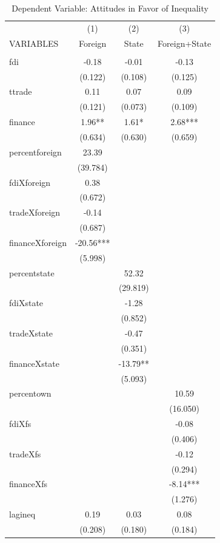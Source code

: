 \documentclass[12pt]{report}
\begin{document}
\begin{table}[htdp]
\caption{Dependent Variable: Attitudes in Favor of Inequality}
\begin{center}
{\footnotesize
\begin{tabular}{lccc} \hline  & (1) & (2) & (3) \\ VARIABLES & Foreign &
State & Foreign+State \\ \hline  &  &
 &  \\ fdi & -0.18 &
-0.01 & -0.13 \\  & (0.122) &
(0.108) & (0.125) \\
ttrade & 0.11 & 0.07 & 0.09 \\  & (0.121) &
(0.073) & (0.109) \\
finance & 1.96** & 1.61* & 2.68*** \\  & (0.634) &
(0.630) & (0.659) \\
percentforeign & 23.39 &  &  \\  & (39.784) &
 &  \\ fdiXforeign &
0.38 &  &  \\  & (0.672) &
 &  \\ tradeXforeign &
-0.14 &  &  \\  & (0.687) &
 &  \\ financeXforeign &
-20.56*** &  &  \\  & (5.998) &
 &  \\ percentstate &  &
52.32 &  \\  &  &
(29.819) &  \\ fdiXstate
&  & -1.28 &  \\  &  &
(0.852) &  \\
tradeXstate &  & -0.47 &  \\  &  &
(0.351) &  \\
financeXstate &  & -13.79** &  \\  &  &
(5.093) &  \\ percentown
&  &  & 10.59 \\  &  &
 & (16.050) \\ fdiXfs &
&  & -0.08 \\  &  &
 & (0.406) \\ tradeXfs &
&  & -0.12 \\  &  &
 & (0.294) \\ financeXfs
&  &  & -8.14*** \\  &  &
 & (1.276) \\ lagineq &
0.19 & 0.03 & 0.08 \\  & (0.208) &
(0.180) & (0.184) \\

\end{tabular}}
\end{center}
\end{table}
\end{document}
